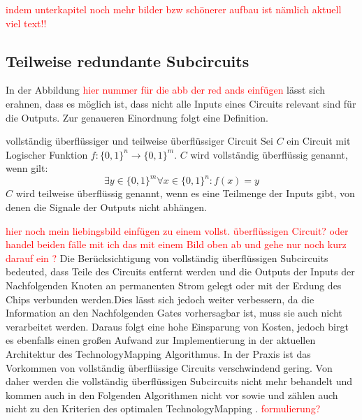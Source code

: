 \documentclass[11pt, a4paper, german]{article}
\newcommand{\TM}{TechnologyMapping }
\begin{document}
 \textcolor{red}{ indem unterkapitel noch mehr bilder bzw schönerer aufbau ist nämlich aktuell viel text!!}
 
 \subsection{Teilweise redundante Subcircuits}
 In der Abbildung \textcolor{red}{hier nummer für die abb der red ands einfügen} lässt sich erahnen, dass es möglich ist, dass nicht alle Inputs eines Circuits relevant sind für die Outputs. Zur genaueren Einordnung folgt eine Definition.\\
 
 \begin{definition}{vollständig überflüssiger und teilweise überflüssiger Circuit }
 	Sei $C$ ein Circuit mit Logischer Funktion $ f : \{ 0 , 1 \}^n \rightarrow \{ 0 , 1 \}^m $. $C$ wird vollständig überflüssig genannt, wenn gilt:
 	\[  \exists y \in \{0,1 \}^m \forall x \in \{ 0, 1\}^n : f(x) = y  \]
 	$C$ wird teilweise überflüssig genannt, wenn es eine Teilmenge der Inputs gibt, von denen die Signale der Outputs nicht abhängen.
 \end{definition}
 \textcolor{red}{hier noch mein liebingsbild einfügen zu einem vollst. überflüssigen Circuit? oder handel beiden fälle mit ich das mit einem Bild oben ab und gehe nur noch kurz darauf ein ?}
 Die Berücksichtigung von vollständig überflüssigen Subcircuits bedeuted, dass Teile des Circuits entfernt werden und die Outputs der Inputs der Nachfolgenden Knoten an permanenten Strom gelegt oder mit der Erdung des Chips verbunden werden.Dies lässt sich jedoch weiter verbessern, da die Information an den Nachfolgenden Gates vorhersagbar ist, muss sie auch nicht verarbeitet werden. Daraus folgt eine hohe Einsparung von Kosten, jedoch birgt es ebenfalls einen großen Aufwand zur Implementierung in der aktuellen Architektur des \TM Algorithmus. In der Praxis ist das Vorkommen von  vollständig überflüssige Circuits verschwindend gering. Von daher werden die vollständig überflüssigen Subcircuits nicht mehr behandelt und kommen auch in den Folgenden Algorithmen nicht vor sowie und zählen auch nicht zu den Kriterien des optimalen \TM. \textcolor{red}{formulierung?} \\
 
\end{document}
